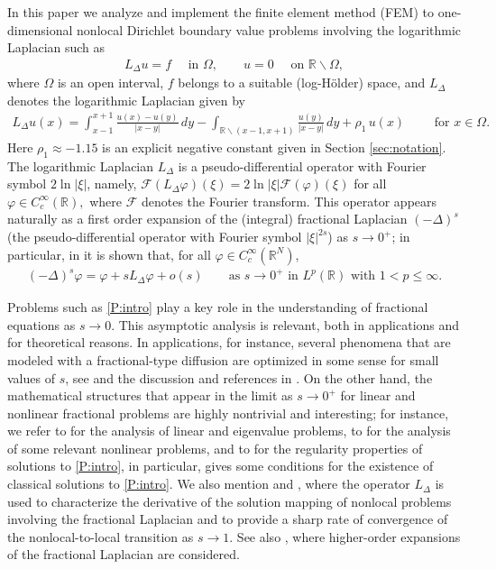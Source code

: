 \documentclass[11 pt]{article}
\numberwithin{equation}{section}
\def\R{\mathbb{R}}
\begin{document}
In this paper we analyze and implement the finite element method (FEM) to one-dimensional nonlocal Dirichlet boundary value problems involving the logarithmic Laplacian such as
\begin{align}\label{P:intro}
    L_\Delta u = f \quad \text{ in }\Omega,\qquad u=0\quad \text{ on }\R\backslash \Omega,
\end{align}
where $\Omega$ is an open interval, $f$ belongs to a suitable (log-Hölder) space, and $L_\Delta$ denotes the logarithmic Laplacian given by
\begin{align}\label{LL}
     L_\Delta u(x)
     =
     \int_{x-1}^{x+1}\frac{u(x)-u(y)}{|x-y|}\, dy
     -\int_{\R\backslash(x-1,x+1)}\frac{u(y)}{|x-y|}\, dy
     +\rho_1\, u(x)\qquad \text{ for }x\in \Omega.
 \end{align}
 Here $\rho_1\approx-1.15$ is an explicit negative constant given in Section \ref{sec:notation}. The logarithmic Laplacian $L_\Delta$ is a pseudo-differential operator with Fourier symbol $2\ln|\xi|$, namely, ${\mathcal F}(L_\Delta \varphi)(\xi)=2\ln|\xi| {\mathcal F}(\varphi)(\xi)$ for all $\varphi\in C^\infty_c(\R),$ where ${\mathcal F}$ denotes the Fourier transform.  This operator appears naturally as a first order expansion of the (integral) fractional Laplacian $(-\Delta)^s$ (the pseudo-differential operator with Fourier symbol $|\xi|^{2s}$) as $s\to 0^+$; in particular, in \cite[Theorem 1.1]{CW19} it is shown that, for all $\varphi\in C^\infty_c(\R^N)$,
\begin{align}\label{intro:exp}
(-\Delta)^s\varphi = \varphi + sL_\Delta \varphi + o(s)\qquad \text{as $s\to 0^+$ in }L^p(\R) \text{ with }1<p\leq \infty.
\end{align}

 Problems such as \eqref{P:intro} play a key role in the understanding of fractional equations as $s\to 0$. This asymptotic analysis is relevant, both in applications and for theoretical reasons.  In applications, for instance, several phenomena that are modeled with a fractional-type diffusion are optimized in some sense for small values of $s$, see \cite{Caffarelli17} and the discussion and references in \cite{HSS22}.  On the other hand,  the mathematical structures that appear in the limit as $s\to 0^+$ for linear and nonlinear fractional problems are highly nontrivial and interesting; for instance, we refer to \cite{CW19,LW21,FJW22} for the analysis of linear and eigenvalue problems, to \cite{AS22,HSS22} for the analysis of some relevant nonlinear problems, and to \cite{CS22} for the regularity properties of solutions to \eqref{P:intro}, in particular, \cite[Theorem 1.1]{CS22} gives some conditions for the existence of classical solutions to \eqref{P:intro}.  We also mention \cite{JSW20} and \cite{JSW24}, where the operator $L_\Delta$ is used to characterize the derivative of the solution mapping of nonlocal problems involving the fractional Laplacian and to provide a sharp rate of convergence of the nonlocal-to-local transition as $s\to1$. See also \cite{chen2023taylor}, where higher-order expansions of the fractional Laplacian are considered.
\end{document}
